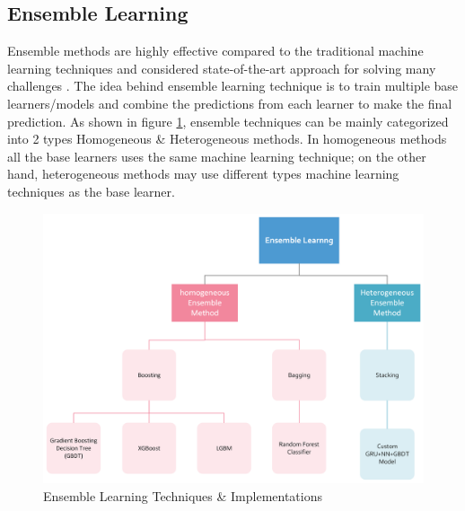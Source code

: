 \documentclass[twoside,11pt,a4paper]{article}
\begin{document}
\subsection{Ensemble Learning}
Ensemble methods are highly effective compared to the traditional machine learning techniques and considered state-of-the-art approach for solving many challenges \citep{sagi2018ensemble}. The idea behind ensemble learning technique is to train multiple base learners/models and combine the predictions from each learner to make the final prediction. As shown in figure \ref{fig:ensemble_learning}, ensemble techniques can be mainly categorized into 2 types Homogeneous \& Heterogeneous methods. In homogeneous methods all the base learners uses the same machine learning technique; on the other hand, heterogeneous methods may use different types machine learning techniques as the base learner.
\begin{figure}[ht]
	\centering
	\includegraphics[width=1\textwidth]{ensemble_learning}
	\caption[Ensemble Learning Techniques]{Ensemble Learning Techniques \& Implementations}
	\label{fig:ensemble_learning}
\end{figure}
\FloatBarrier
\end{document}
